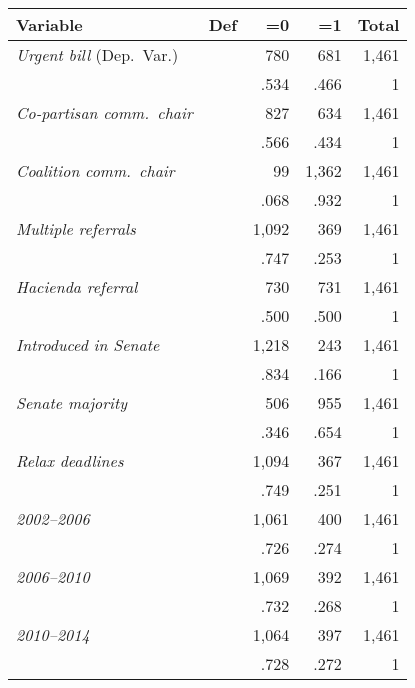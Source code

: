 \documentclass[letter,12pt]{article}
\begin{document}
\begin{footnotesize}

\begin{tabular}{llrrr}
 Variable                          & Def &       =0 &       =1 & Total  \\ \hline
\emph{Urgent bill} (Dep.~Var.)     &     &    780 &   681 & 1,461 \\ [-.75ex]
                                   &     &   .534 &  .466 &   1   \\
\emph{Co-partisan comm.~chair}     &     &    827 &   634 & 1,461 \\ [-.75ex]
                                   &     &   .566 &  .434 &   1   \\
\emph{Coalition comm.~chair}       &     &     99 & 1,362 & 1,461 \\ [-.75ex]
                                   &     &   .068 &  .932 &   1   \\
\emph{Multiple referrals}          &     &  1,092 &   369 & 1,461 \\ [-.75ex]
                                   &     &   .747 &  .253 &   1   \\
\emph{Hacienda referral}           &     &    730 &   731 & 1,461 \\ [-.75ex]
                                   &     &   .500 &  .500 &   1   \\
\emph{Introduced in Senate}        &     &  1,218 &   243 & 1,461 \\ [-.75ex]
                                   &     &   .834 &  .166 &   1   \\
\emph{Senate majority}             &     &    506 &   955 & 1,461 \\ [-.75ex]
                                   &     &   .346 &  .654 &   1   \\
\emph{Relax deadlines}             &     &  1,094 &   367 & 1,461 \\ [-.75ex]
                                   &     &   .749 &  .251 &   1   \\
\emph{2002--2006}                  &     &  1,061 &   400 & 1,461 \\ [-.75ex]
                                   &     &   .726 &  .274 &   1   \\
\emph{2006--2010}                  &     &  1,069 &   392 & 1,461 \\ [-.75ex]
                                   &     &   .732 &  .268 &   1   \\
\emph{2010--2014}                  &     &  1,064 &   397 & 1,461 \\ [-.75ex]
                                   &     &   .728 &  .272 &   1   \\
\end{tabular}

\end{footnotesize}
  
\end{document}
